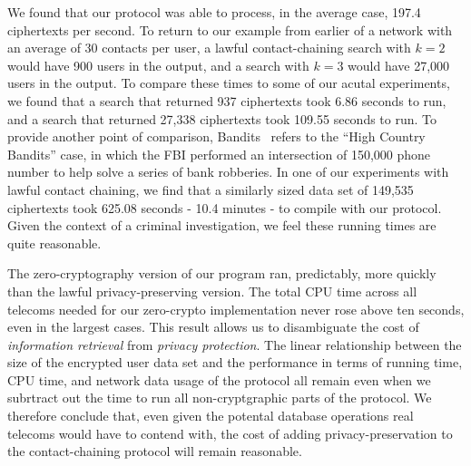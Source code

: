 We found that our protocol was able to process, in the average case, 197.4 ciphertexts per second. To return to our example from earlier of a network with an average of 30 contacts per user, a lawful contact-chaining search with $k=2$ would have 900 users in the output, and a search with $k=3$ would have 27,000 users in the output. To compare these times to some of our acutal experiments, we found that a search that returned 937 ciphertexts took 6.86 seconds to run, and a search that returned 27,338 ciphertexts took 109.55 seconds to run. To provide another point of comparison, Bandits~\cite{sff-foci2014} refers to the ``High Country Bandits'' case, in which the FBI performed an intersection of 150,000 phone number to help solve a series of bank robberies. In one of our experiments with lawful contact chaining, we find that a similarly sized data set of 149,535 ciphertexts took 625.08 seconds - 10.4 minutes - to compile with our protocol. Given the context of a criminal investigation, we feel these running times are quite reasonable. 

The zero-cryptography version of our program ran, predictably, more quickly than the lawful privacy-preserving version. The total CPU time across all telecoms needed for our zero-crypto implementation never rose above ten seconds, even in the largest cases. This result allows us to disambiguate the cost of \emph{information retrieval} from \emph{privacy protection}. The linear relationship between the size of the encrypted user data set and the performance in terms of running time, CPU time, and network data usage of the protocol all remain even when we subrtract out the time to run all non-cryptgraphic parts of the protocol. We therefore conclude that, even given the potental database operations real telecoms would have to contend with, the cost of adding privacy-preservation to the contact-chaining protocol will remain reasonable.
